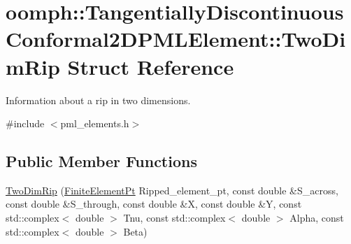 \hypertarget{structoomph_1_1TangentiallyDiscontinuousConformal2DPMLElement_1_1TwoDimRip}{}\section{oomph\+:\+:Tangentially\+Discontinuous\+Conformal2\+D\+P\+M\+L\+Element\+:\+:Two\+Dim\+Rip Struct Reference}
\label{structoomph_1_1TangentiallyDiscontinuousConformal2DPMLElement_1_1TwoDimRip}


Information about a rip in two dimensions.  




{\ttfamily \#include $<$pml\+\_\+elements.\+h$>$}

\subsection*{Public Member Functions}
\begin{DoxyCompactItemize}
\item 
\hyperlink{structoomph_1_1TangentiallyDiscontinuousConformal2DPMLElement_1_1TwoDimRip_ab238ef0f30bafbf3ed5515ec15f4af9a}{Two\+Dim\+Rip} (\hyperlink{namespaceoomph_a3a774afab5900fed47e092a013f9efb8}{Finite\+Element\+Pt} Ripped\+\_\+element\+\_\+pt, const double \&S\+\_\+across, const double \&S\+\_\+through, const double \&X, const double \&Y, const std\+::complex$<$ double $>$ Tnu, const std\+::complex$<$ double $>$ Alpha, const std\+::complex$<$ double $>$ Beta)
\end{DoxyCompactItemize}
